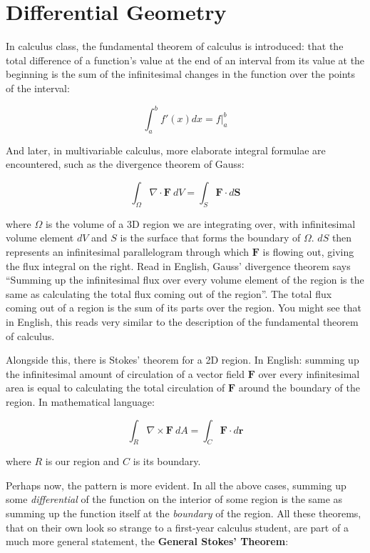 
\chapter{Differential Geometry}

In calculus class, the fundamental theorem of calculus is introduced: that the total difference of a function's value at the end of an interval from its value at the beginning is the sum of the infinitesimal changes in the function over the points of the interval:

	\begin{equation}\label{eq:FTOC}
		\int_a^b f'(x) dx = f\Big\rvert^b_a
	\end{equation}

And later, in multivariable calculus, more elaborate integral formulae are encountered, such as the divergence theorem of Gauss:

	\begin{equation}\label{eq:Divergence}
		\int_\Omega \nabla \cdot \mathbf{F} ~ dV = \int_S \mathbf{F} \cdot d\mathbf S
	\end{equation}

	where $\Omega$ is the volume of a 3D region we are integrating over, with infinitesimal volume element $dV$ and $S$ is the surface that forms the boundary of $\Omega$. $dS$ then represents an infinitesimal parallelogram through which $\mathbf{F}$ is flowing out, giving the flux integral on the right. Read in English, Gauss' divergence theorem says ``Summing up the infinitesimal flux over every volume element of the region is the same as calculating the total flux coming out of the region''. The total flux coming out of a region is the sum of its parts over the region. You might see that in English, this reads very similar to the description of the fundamental theorem of calculus.
	
	Alongside this, there is Stokes' theorem for a 2D region. In English: summing up the infinitesimal amount of circulation of a vector field $\mathbf F$ over every infinitesimal area is equal to calculating the total circulation of $\mathbf F$ around the boundary of the region. In mathematical language:
	
	\begin{equation}\label{eq:Stokes}
		\int_R \nabla \times \mathbf{F} ~ dA = \int_C \mathbf{F} \cdot d\mathbf r
	\end{equation}
	
	where $R$ is our region and $C$ is its boundary.
	
	Perhaps now, the pattern is more evident. In all the above cases, summing up some \emph{differential} of the function on the interior of some region is the same as summing up the function itself at the \emph{boundary} of the region. All these theorems, that on their own look so strange to a first-year calculus student, are part of a much more general statement, the \textbf{General Stokes' Theorem}:

